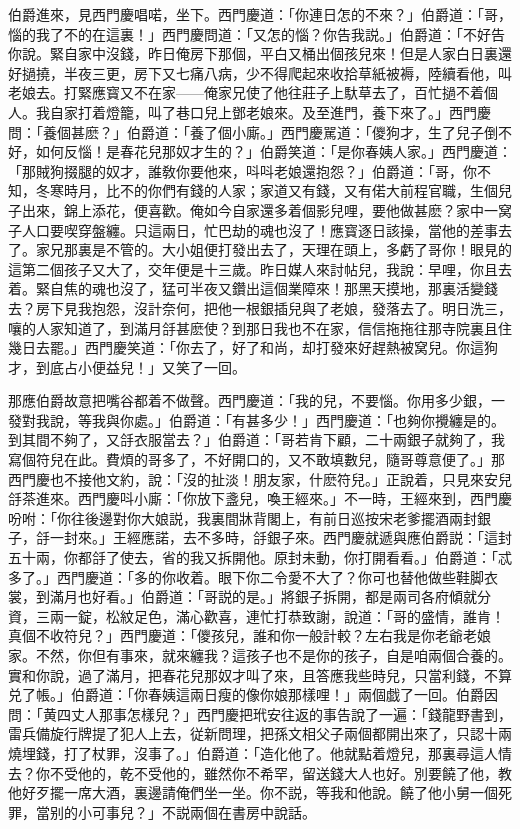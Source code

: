 伯爵進來，見西門慶唱喏，坐下。西門慶道：「你連日怎的不來？」伯爵道：「哥，惱的我了不的在這裏！」西門慶問道：「又怎的惱？你告我説。」伯爵道：「不好告你說。緊自家中沒錢，昨日俺房下那個，平白又桶出個孩兒來！但是人家白日裏還好撾撓，半夜三更，房下又七痛八病，少不得爬起來收拾草紙被褥，陸續看他，叫老娘去。打緊應寳又不在家——俺家兄使了他往莊子上馱草去了，百忙撾不着個人。我自家打着燈籠，叫了巷口兒上鄧老娘來。及至進門，養下來了。」西門慶問：「養個甚麽？」伯爵道：「養了個小廝。」西門慶駡道：「儍狗才，生了兒子倒不好，如何反惱！是春花兒那奴才生的？」伯爵笑道：「是你春姨人家。」西門慶道：「那賊狗掇腿的奴才，誰敎你要他來，呌呌老娘還抱怨？」伯爵道：「哥，你不知，冬寒時月，比不的你們有錢的人家；家道又有錢，又有偌大前程官職，生個兒子出來，錦上添花，便喜歡。俺如今自家還多着個影兒哩，要他做甚麽？家中一窝子人口要喫穿盤纏。只這兩日，忙巴劫的魂也沒了！應寳逐日該操，當他的差事去了。家兄那裏是不管的。大小姐便打發出去了，天理在頭上，多虧了哥你！眼見的這第二個孩子又大了，交年便是十三歲。昨日媒人來討帖兒，我說：早哩，你且去着。緊自焦的魂也沒了，猛可半夜又鑽出這個業障來！那黑天摸地，那裏活變錢去？房下見我抱怨，沒計奈何，把他一根銀插兒與了老娘，發落去了。明日洗三，嚷的人家知道了，到滿月㧱甚麽使？到那日我也不在家，信信拖拖往那寺院裏且住幾日去罷。」西門慶笑道：「你去了，好了和尚，却打發來好趕熱被窝兒。你這狗才，到底占小便益兒！」又笑了一回。

那應伯爵故意把嘴谷都着不做聲。西門慶道：「我的兒，不要惱。你用多少銀，一發對我說，等我與你處。」伯爵道：「有甚多少！」西門慶道：「也夠你攪纏是的。到其間不夠了，又㧱衣服當去？」伯爵道：「哥若肯下顧，二十兩銀子就夠了，我寫個符兒在此。費煩的哥多了，不好開口的，又不敢填數兒，隨哥尊意便了。」那西門慶也不接他文約，說：「沒的扯淡！朋友家，什麽符兒。」正說着，只見來安兒㧱茶進來。西門慶呌小廝：「你放下盞兒，喚王經來。」不一時，王經來到，西門慶吩咐：「你往後邊對你大娘説，我裏間牀背閣上，有前日巡按宋老爹擺酒兩封銀子，㧱一封來。」王經應諾，去不多時，㧱銀子來。西門慶就遞與應伯爵説：「這封五十兩，你都㧱了使去，省的我又拆開他。原封未動，你打開看看。」伯爵道：「忒多了。」西門慶道：「多的你收着。眼下你二令愛不大了？你可也替他做些鞋脚衣裳，到滿月也好看。」伯爵道：「哥説的是。」將銀子拆開，都是兩司各府傾就分資，三兩一錠，松紋足色，滿心歡喜，連忙打恭致謝，說道：「哥的盛情，誰肯！真個不收符兒？」西門慶道：「儍孩兒，誰和你一般計較？左右我是你老爺老娘家。不然，你但有事來，就來纏我？這孩子也不是你的孩子，自是咱兩個合養的。實和你說，過了滿月，把春花兒那奴才叫了來，且答應我些時兒，只當利錢，不算兑了帳。」伯爵道：「你春姨這兩日瘦的像你娘那樣哩！」兩個戯了一回。伯爵因問：「黄四丈人那事怎樣兒？」西門慶把玳安往返的事告說了一遍：「錢龍野書到，雷兵備旋行牌提了犯人上去，従新問理，把孫文相父子兩個都開出來了，只認十兩燒埋錢，打了杖罪，沒事了。」伯爵道：「造化他了。他就點着燈兒，那裏尋這人情去？你不受他的，乾不受他的，雖然你不希罕，留送錢大人也好。別要饒了他，教他好歹擺一席大酒，裏邊請俺們坐一坐。你不説，等我和他說。饒了他小舅一個死罪，當别的小可事兒？」不説兩個在書房中說話。

